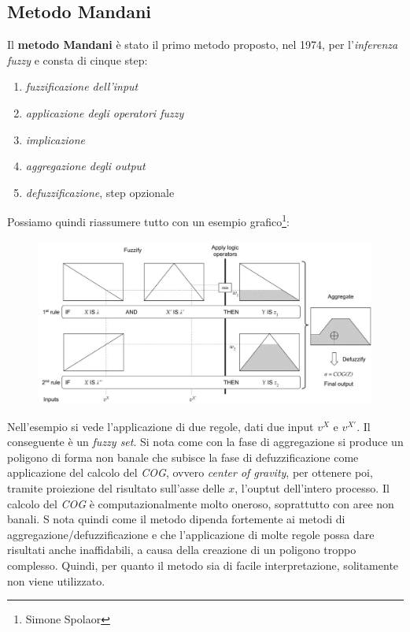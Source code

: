 \documentclass[a4paper,12pt, oneside]{book}
\begin{document}
\subsection{Metodo Mandani}
Il \textbf{metodo Mandani} è stato il primo metodo proposto, nel 1974, per
l'\textit{inferenza fuzzy} e consta di cinque step:
\begin{enumerate}
  \item \textit{fuzzificazione dell'input}
  \item \textit{applicazione degli operatori fuzzy}
  \item \textit{implicazione}
  \item \textit{aggregazione degli output}
  \item \textit{defuzzificazione}, step opzionale
\end{enumerate}
Possiamo quindi riassumere tutto con un esempio grafico\footnote{Simone
  Spolaor}: 
\begin{figure}[H]
  \centering
  \includegraphics[scale = 0.27]{img/mandani.jpg}
\end{figure}
Nell'esempio si vede l'applicazione di due regole, dati due input $v^X$ e
$v^{X'}$. Il conseguente è un \textit{fuzzy set}. Si nota come con la fase di
aggregazione si produce un poligono di 
forma non banale che subisce la fase di defuzzificazione come applicazione del
calcolo del \textit{COG}, ovvero \textit{center of gravity}, per ottenere poi,
tramite proiezione del risultato sull'asse delle $x$, l'ouptut dell'intero
processo. Il calcolo del \textit{COG} è computazionalmente molto oneroso,
soprattutto con aree non banali. S
nota quindi come il metodo dipenda fortemente ai metodi di
aggregazione/defuzzificazione e che l'applicazione di molte regole possa dare
risultati anche inaffidabili, a causa della creazione di un poligono troppo
complesso. Quindi, per quanto il metodo sia di facile interpretazione,
solitamente non viene utilizzato.
\newpage
\end{document}
